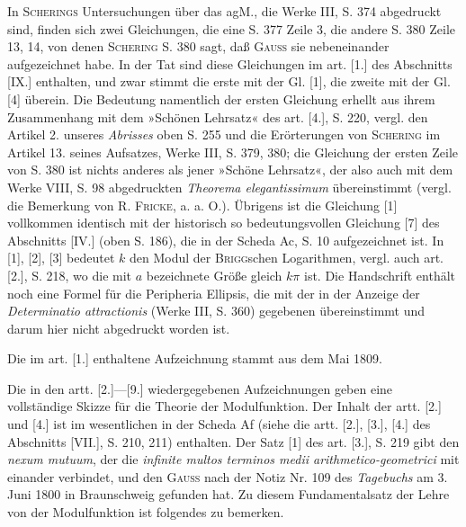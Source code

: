 \begingroup
\makeatletter\tagsleft@true\let\veqno\@@leqno\makeatother
{}
\begin{center}\end{center}
\par\indent In \textsc{Scherings} Untersuchungen über das agM., die Werke III, S. 374 abgedruckt sind, finden sich zwei Gleichungen, die eine S. 377 Zeile 3, die andere S. 380 Zeile 13, 14, von denen \textsc{Schering} S. 380 sagt, daß \textsc{Gauss} sie nebeneinander aufgezeichnet habe. In der Tat sind diese Gleichungen im art. [1.] des
\clearpage
\fancyhead{}
\noindent Abschnitts [IX.] enthalten, und zwar stimmt die erste mit der Gl. [1], die zweite mit der Gl. [4] überein. Die Bedeutung namentlich der ersten Gleichung erhellt aus ihrem Zusammenhang mit dem »Schönen Lehrsatz« des art. [4.], S. 220, vergl. den Artikel 2. unseres \textit{Abrisses} oben S. 255 und die Erörterungen von \textsc{Schering} im Artikel 13. seines Aufsatzes, Werke III, S. 379, 380; die Gleichung der ersten Zeile von S. 380 ist nichts anderes als jener »Schöne Lehrsatz«, der also auch mit dem Werke VIII, S. 98 abgedruckten \textit{Theorema elegantissimum} übereinstimmt (vergl. die Bemerkung von R. \textsc{Fricke}, a. a. O.). Übrigens ist die Gleichung [1] vollkommen identisch mit der historisch so bedeutungsvollen Gleichung [7] des Abschnitts [IV.] (oben S. 186), die in der Scheda Ac, S. 10 aufgezeichnet ist. In [1], [2], [3] bedeutet $k$ den Modul der \textsc{Brigg}schen Logarithmen, vergl. auch art. [2.], S. 218, wo die mit $a$ bezeichnete Größe gleich $k\pi$ ist. Die Handschrift enthält noch eine Formel für die Peripheria Ellipsis, die mit der in der Anzeige der \textit{Determinatio attractionis} (Werke III, S. 360) gegebenen übereinstimmt und darum hier nicht abgedruckt worden ist.
\par\indent Die im art. [1.] enthaltene Aufzeichnung stammt aus dem Mai 1809.
\par\indent Die in den artt. [2.]—[9.] wiedergegebenen Aufzeichnungen geben eine vollständige Skizze für die Theorie der Modulfunktion. Der Inhalt der artt. [2.] und [4.] ist im wesentlichen in der Scheda Af (siehe die artt. [2.], [3.], [4.] des Abschnitts [VII.], S. 210, 211) enthalten. Der Satz [1] des art. [3.], S. 219 gibt den \textit{nexum mutuum}, der die \textit{infinite multos terminos medii arithmetico-geometrici} mit einander verbindet, und den \textsc{Gauss} nach der Notiz Nr. 109 des \textit{Tagebuchs} am 3. Juni 1800 in Braunschweig gefunden hat. Zu diesem Fundamentalsatz der Lehre von der Modulfunktion ist folgendes zu bemerken.
